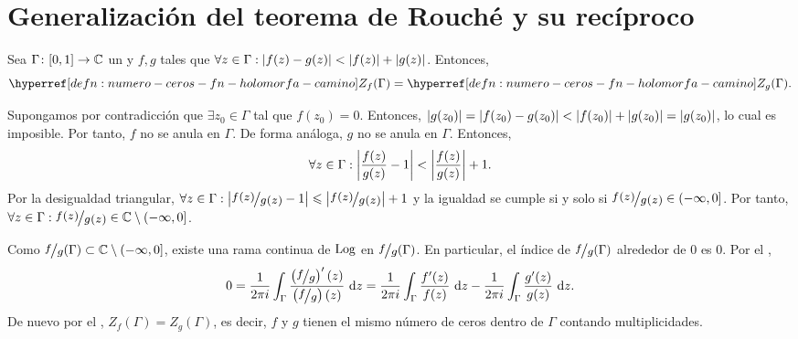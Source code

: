 \section{Generalización del teorema de Rouché y su recíproco}

\begin{teo}[Glicksberg]\label{teo:glicksberg}
    Sea $\Gamma \colon [0, 1] \to \mathbb{C}$ un    y $f, g$  tales que $\forall z \in \Gamma : \left|f(z) - g(z)\right| < \left|f(z)\right| + \left|g(z)\right|$. Entonces,
    \[
    \exhyperref[defn:numero-ceros-fn-holomorfa-camino]{numero-ceros-fn-holomorfa-camino}{Z_f}(\Gamma) = \exhyperref[defn:numero-ceros-fn-holomorfa-camino]{numero-ceros-fn-holomorfa-camino}{Z_g}(\Gamma).
    \]
\end{teo}
\begin{dem}
    Supongamos por contradicción que $\exists z_0 \in \Gamma$ tal que $f(z_0) = 0$. Entonces, $\left|g(z_0)\right| = \left|f(z_0) - g(z_0)\right| < \left|f(z_0)\right| + \left|g(z_0)\right| = \left|g(z_0)\right|$, lo cual es imposible. Por tanto, $f$ no se anula en $\Gamma$. De forma análoga, $g$ no se anula en $\Gamma$. Entonces,
    \[
    \forall z \in \Gamma : \left|\frac{f(z)}{g(z)} - 1\right| < \left|\frac{f(z)}{g(z)}\right| + 1.
    \]
    Por la desigualdad triangular, $\forall z \in \Gamma : \abs{\sfrac{f(z)}{g(z)} - 1} \leq \abs{\sfrac{f(z)}{g(z)}} + 1$ y la igualdad se cumple si y solo si $\sfrac{f(z)}{g(z)} \in (-\infty, 0]$. Por tanto, $\forall z \in \Gamma : \sfrac{f(z)}{g(z)} \in \C \setminus (-\infty, 0]$.

    Como $\sfrac{f}{g}(\Gamma) \subset \C \setminus (-\infty,0]$, existe una rama continua de $\operatorname{Log}$ en $\sfrac{f}{g}(\Gamma)$. En particular, el índice de $\sfrac{f}{g}(\Gamma)$ alrededor de $0$ es $0$. Por el ,
    \[
    0 = \frac{1}{2\pi i} \int_\Gamma \frac{\left(\sfrac{f}{g}\right)'(z)}{\left(\sfrac{f}{g}\right)(z)} \, \odif{z} = \frac{1}{2\pi i} \int_\Gamma \frac{f'(z)}{f(z)} \, \odif{z} - \frac{1}{2\pi i} \int_\Gamma \frac{g'(z)}{g(z)} \, \odif{z}.
    \]
    De nuevo por el , $Z_f(\Gamma) = Z_g(\Gamma)$, es decir, $f$ y $g$ tienen el mismo número de ceros dentro de $\Gamma$ contando multiplicidades.\hfill\qedsymbol
\end{dem}

